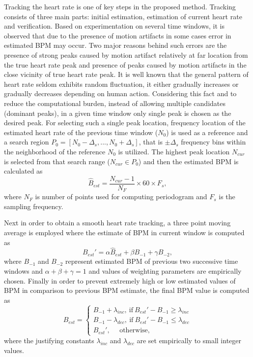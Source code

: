 \documentclass[final,3p,times,authoryear]{elsarticle}
\begin{document}
Tracking the heart rate is one of key steps in the proposed method. Tracking consists of three main parts: initial estimation, estimation of current heart rate and verification. Based on experimentation on several time windows, it is observed that due to the presence of motion artifacts in some cases error in estimated BPM may occur. Two major reasons behind such errors are the presence of strong peaks caused by motion artifact relatively at far location from the true heart rate peak and presence of peaks caused by motion artifacts in the close vicinity of true heart rate peak. It is well known that the general pattern of heart rate seldom exhibits random fluctuation, it either gradually increases or gradually decreases depending on human action. Considering this fact and to reduce the computational burden, instead of allowing multiple candidates (dominant peaks), in a given time window only single peak is chosen as the desired peak. For selecting such a single peak location, frequency location of the estimated heart rate of the previous time window ($N_0$) is used as a reference and a search region $P_0  =[ N_0-\Delta_s, . . ., N_0+\Delta_s ]$, that is $\pm\Delta_s$ frequency bins within the neighborhood of the reference $N_0$ is utilized. The highest peak location $N_{cur}$ is selected from that search range ($N_{cur} \in P_0$) and then the estimated BPM is calculated as 
\begin{equation}
 \hat{B}_{est} = \frac{N_{cur}-1}{N_{F}}  \times 60  \times F_s,
\end{equation}  
where $N_{F}$ is number of points used for computing periodogram and $F_s$ is the sampling frequency. 

 Next in order to obtain a smooth heart rate tracking, a three point moving average is employed where the estimate of BPM in current window is computed as  
\begin{equation}
B_{est}' = \alpha \hat{B}_{est} + \beta B_{-1} + \gamma B_{-2},
\end{equation}
where $B_{-1}$ and $B_{-2}$ represent estimated BPM of previous two successive time windows and $\alpha+ \beta + \gamma = 1$ and values of weighting parameters are empirically chosen. Finally  in order to prevent extremely high or low estimated values of BPM in comparison to previous BPM estimate, the final BPM value is computed as 
\begin{equation}
B_{est}= 
\begin{cases}
B_{-1}+\lambda_{inc},\ \text{if} \ B_{est}'-B_{-1} \geq  \lambda_{inc}
\\
B_{-1}-\lambda_{dec},\ \text{if} \ B_{est}'-B_{-1} \leq  \lambda_{dec}
\\
B_{est}',\ \ \ \ \ \ \text{otherwise},
\end{cases}
\end{equation} 
where the justifying constants $\lambda_{inc}$ and $\lambda_{dec}$ are set empirically to small integer values.
\end{document}
